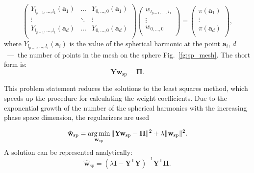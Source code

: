\documentclass[12pt,twoside]{article}
\begin{document}
\begin{equation}
\begin{pmatrix} 
	{Y}_{l_{p-1},...,l_1}({\mathbf{a}}_1) & \ldots & {Y}_{0,...,0}({\mathbf{a}}_1)\\
	\vdots& \ddots & \vdots\\
	{Y}_{l_{p-1},...,l_1}({\mathbf{a}}_d) & \ldots & {Y}_{0,...,0}({\mathbf{a}}_d)\\
\end{pmatrix}
\begin{pmatrix} 
	w_{l_{p-1},...,l_1}\\
	\vdots\\
	w_{0,...,0}\\
\end{pmatrix}
=
\begin{pmatrix} 
	\pi(\mathbf{a}_1)\\
	\vdots\\
	\pi(\mathbf{a}_d)\\
\end{pmatrix},
\label{eq:sp_app_matrix}
\end{equation}
\noindent where $Y_{l_{p-1},...,l_1}({\mathbf{a}}_i)$ is the value of the spherical harmonic at the point ${\mathbf{a}}_i$, $d$~---~the number of points in the mesh on the sphere Fig.~\ref{fg:sp_mesh}.
The short form is:
\begin{equation}
\mathbf{{Y}}\mathbf{w}_{\text{sp}} = \mathbf{\Pi}.
\label{eq:sp_app_matrix_short}
\end{equation}

This problem statement reduces the solutions to the least squares method, which speeds up the procedure for calculating the weight coefficients.
Due to the exponential growth of the number of the spherical harmonics with the increasing phase space dimension, the regularizers are used

\begin{equation}
    \mathbf{\hat{w}}_{\text{sp}} = \argmin_{\mathbf{w}_{\text{sp}}}
    \|\mathbf{{Y}}\mathbf{w}_{\text{sp}} - \mathbf{\Pi}\|^2 + \lambda\|\mathbf{w}_{\text{sp}}\|^2.
\label{eq:arg_l2}
\end{equation}
A solution can be represented analytically:
\begin{equation}
    \mathbf{\hat{w}}_{\text{sp}} = (\lambda \mathbf{I} - \mathbf{{Y}}^{\mathsf{T}}\mathbf{{Y}})^{-1}\mathbf{{Y}}^{\mathsf{T}}\mathbf{\Pi}.
\label{eq:arg_l2_solution}
\end{equation}

\end{document}
